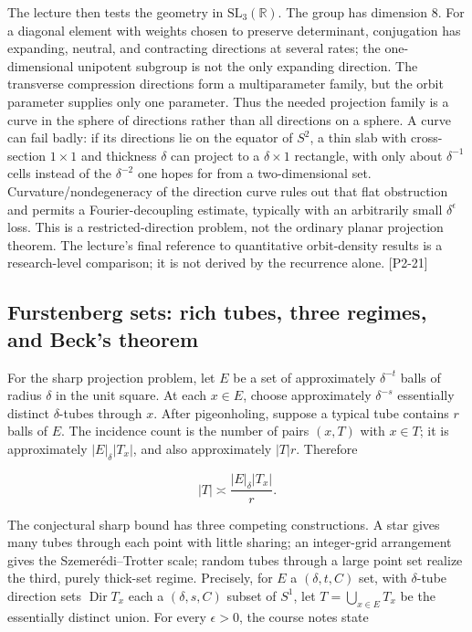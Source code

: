 The lecture then tests the geometry in \(\mathrm{SL}_3(\mathbb R)\). The group has dimension \(8\). For a diagonal element with weights chosen to preserve determinant, conjugation has expanding, neutral, and contracting directions at several rates; the one-dimensional unipotent subgroup is not the only expanding direction. The transverse compression directions form a multiparameter family, but the orbit parameter supplies only one parameter. Thus the needed projection family is a curve in the sphere of directions rather than all directions on a sphere. A curve can fail badly: if its directions lie on the equator of \(S^2\), a thin slab with cross-section \(1\times1\) and thickness \(\delta\) can project to a \(\delta\times1\) rectangle, with only about \(\delta^{-1}\) cells instead of the \(\delta^{-2}\) one hopes for from a two-dimensional set. Curvature/nondegeneracy of the direction curve rules out that flat obstruction and permits a Fourier-decoupling estimate, typically with an arbitrarily small \(\delta^\epsilon\) loss. This is a restricted-direction problem, not the ordinary planar projection theorem. The lecture's final reference to quantitative orbit-density results is a research-level comparison; it is not derived by the recurrence alone. {[}P2-21{]}

\subsection{Furstenberg sets: rich tubes, three regimes, and Beck's theorem}\label{04-visual-computing-ii-ch033-furstenberg-sets-rich-tubes-three-regimes-and-becks-theorem-1}

\hypertarget{04-visual-computing-ii-ch033-furstenberg-sets-rich-tubes-three-regimes-and-becks-theorem-1}{}

For the sharp projection problem, let \(E\) be a set of approximately \(\delta^{-t}\) balls of radius \(\delta\) in the unit square. At each \(x\in E\), choose approximately \(\delta^{-s}\) essentially distinct \(\delta\)-tubes through \(x\). After pigeonholing, suppose a typical tube contains \(r\) balls of \(E\). The incidence count is the number of pairs \((x,T)\) with \(x\in T\); it is approximately \(|E|_\delta |T_x|\), and also approximately \(|T|r\). Therefore

\[|T|\asymp \frac{|E|_\delta |T_x|}{r}.\]

The conjectural sharp bound has three competing constructions. A star gives many tubes through each point with little sharing; an integer-grid arrangement gives the Szemerédi--Trotter scale; random tubes through a large point set realize the third, purely thick-set regime. Precisely, for \(E\) a \((\delta,t,C)\) set, with \(\delta\)-tube direction sets \(\operatorname{Dir}T_x\) each a \((\delta,s,C)\) subset of \(S^1\), let \(T=\bigcup_{x\in E}T_x\) be the essentially distinct union. For every \(\epsilon>0\), the course notes state

